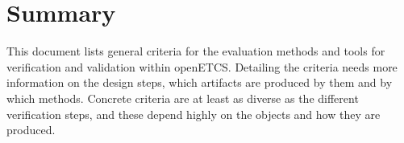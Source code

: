 \documentclass{template/openetcs_article}
\begin{document}
\section{Summary}
\label{sec:summary}

This document lists general criteria for the evaluation methods and
tools for verification and validation within openETCS. Detailing the
criteria needs more information on the design steps, which artifacts
are produced by them and by which methods. Concrete criteria are at
least as diverse as the different verification steps, and these depend
highly on the objects and how they are produced.


%



\end{document}
